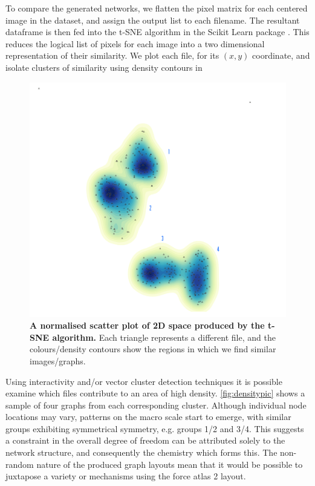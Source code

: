 To compare the generated networks, we flatten the pixel matrix for each centered image in the dataset, and assign the output list to each filename. The resultant dataframe is then fed into the t-SNE algorithm in the Scikit Learn package \citep{scikit-learn}. This reduces the logical list of pixels for each image into a two dimensional representation of their similarity. We plot each file, for its $(x,y)$ coordinate, and isolate clusters of similarity using density contours in 

    \begin{figure}[H]
         \centering
    \includegraphics[width=.6\textwidth]{figures_c1/beijingtest/density.png}
     \caption{\textbf{A normalised scatter plot of 2D space produced by the t-SNE algorithm.} Each triangle represents a different file, and the colours/density contours show the regions in which we find similar images/graphs. }
     \label{fig:densty}
     \end{figure}

Using interactivity and/or vector cluster detection techniques it is possible examine which files contribute to an area of high density. \autoref{fig:densitypic} shows a sample of four graphs from each corresponding cluster. Although individual node locations may vary, patterns on the macro scale start to emerge, with similar groups exhibiting symmetrical symmetry, e.g. groups 1/2 and 3/4. This suggests a constraint in the overall degree of freedom can be attributed solely to the network structure, and consequently the chemistry which forms this. The non-random nature of the produced graph layouts mean that it would be possible to juxtapose a variety or mechanisms using the force atlas 2 layout.

